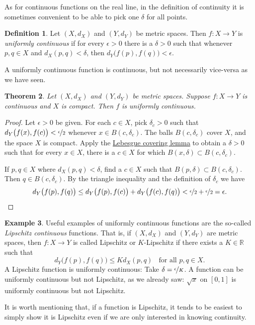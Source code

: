 \documentclass[12pt,openany]{book}
\newcommand{\R}{{\mathbb{R}}}
\theoremstyle{plain}
\newtheorem{thm}{Theorem}[section]
\theoremstyle{remark}
\theoremstyle{definition}
\newtheorem{defn}[thm]{Definition}
\theoremstyle{exercise}
\theoremstyle{example}
\newtheorem{example}[thm]{Example}
\begin{document}
As for continuous
functions on the real line, in the definition of continuity
it is sometimes convenient to be able to pick
one $\delta$ for all points.

\begin{defn}
Let $(X,d_X)$ and $(Y,d_Y)$ be metric spaces.
Then $f \colon X \to Y$ is
\emph{uniformly continuous}
if for every $\epsilon > 0$
there is a $\delta > 0$ such that whenever $p,q \in X$ and $d_X(p,q) <
\delta$, then
$d_Y\bigl(f(p),f(q)\bigr) < \epsilon$.
\end{defn}

A uniformly continuous function is continuous, but not necessarily
vice-versa as we have seen.

\begin{thm} \label{thm:Xcompactfunifcont}
Let $(X,d_X)$ and $(Y,d_Y)$ be metric spaces.
Suppose $f \colon X \to Y$ is continuous and $X$ is compact.  Then
$f$ is uniformly continuous.
\end{thm}

\begin{proof}
Let $\epsilon > 0$ be given.  For each $c \in X$, pick $\delta_c > 0$ such that
$d_Y\bigl(f(x),f(c)\bigr) < \nicefrac{\epsilon}{2}$
whenever
$x \in B(c,\delta_c)$.
The balls
$B(c,\delta_c)$ cover $X$, and the space $X$ is compact.  
Apply the \hyperref[ms:lebesgue]{Lebesgue covering lemma} to obtain a 
$\delta > 0$ such that for every $x \in X$, there is a $c \in X$
for which $B(x,\delta) \subset B(c,\delta_c)$.

If $p, q \in X$ where $d_X(p,q) < \delta$,
find a $c \in X$ such that $B(p,\delta) \subset B(c,\delta_c)$.
Then $q \in B(c,\delta_c)$.  By the triangle inequality
and the definition of $\delta_c$ we have
\begin{equation*}
d_Y\bigl(f(p),f(q)\bigr)
\leq
d_Y\bigl(f(p),f(c)\bigr)
+
d_Y\bigl(f(c),f(q)\bigr)
<
\nicefrac{\epsilon}{2}+
\nicefrac{\epsilon}{2} = \epsilon .  \qedhere
\end{equation*}
\end{proof}


\begin{example}
Useful examples of uniformly continuous functions are the so-called
\emph{Lipschitz continuous}%
%
functions.  That is, if
$(X,d_X)$ and $(Y,d_Y)$ are metric spaces, then $f \colon X \to Y$
is called Lipschitz or $K$-Lipschitz if there exists a $K \in \R$ such that
\begin{equation*}
d_Y\bigl(f(p),f(q)\bigr) \leq K d_X(p,q)
\ \ \ \ \text{for all } p,q \in X.
\end{equation*}
A Lipschitz function is uniformly continuous:
Take $\delta = \nicefrac{\epsilon}{K}$.
A function can be uniformly continuous
but not Lipschitz,
as we already saw: $\sqrt{x}$ on $[0,1]$
is uniformly continuous but not Lipschitz.

It is worth mentioning that,
if a function is Lipschitz, it tends to be
easiest to simply show it is Lipschitz even if we are only
interested in knowing continuity.
\end{example}
\end{document}

